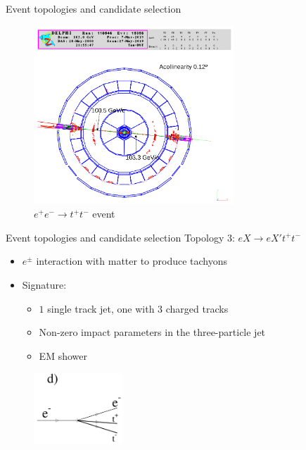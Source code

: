 \documentclass{beamer}
\begin{document}
\begin{frame}{Event topologies and candidate selection}
  \begin{figure}
    \centering
    \includegraphics[width = 0.67\textwidth]{Topology2.png}
    \caption{$e^+e^-\to t^+t^-$ event}
  \end{figure}
\end{frame}

\begin{frame}{Event topologies and candidate selection}
  Topology $3$: $eX\to eX't^+t^-$
  \begin{itemize}
    \item{$e^\pm$ interaction with matter to produce tachyons}
    \item{Signature:}
    \begin{itemize}
      \item{$1$ single track jet, one with $3$ charged tracks}
      \item{Non-zero impact parameters in the three-particle jet}
      \item{EM shower}
    \end{itemize}
  \end{itemize}
  \begin{figure}
    \centering
    \includegraphics[width = 0.3\textwidth]{TopologyD.png}
  \end{figure}%
\end{frame}
\end{document}
